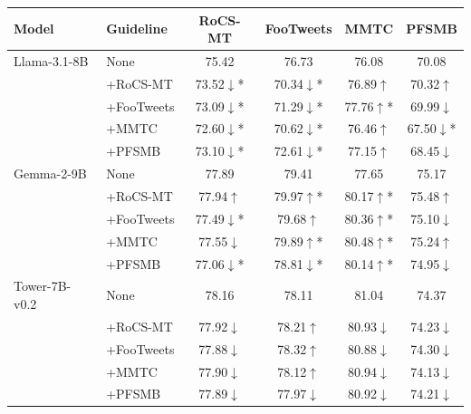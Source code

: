 \begin{tabular}{llcccc}
\toprule
Model & Guideline & RoCS-MT & FooTweets & MMTC & PFSMB \\
\midrule
Llama-3.1-8B & None & 75.42 & 76.73 & 76.08 & 70.08 \\
 & +RoCS-MT & 73.52\colorbox{myred}{$\downarrow$}* & 70.34\colorbox{myred}{$\downarrow$}* & 76.89\colorbox{mygreen}{$\uparrow$} & 70.32\colorbox{mygreen}{$\uparrow$} \\
 & +FooTweets & 73.09\colorbox{myred}{$\downarrow$}* & 71.29\colorbox{myred}{$\downarrow$}* & 77.76\colorbox{mygreen}{$\uparrow$}* & 69.99\colorbox{myred}{$\downarrow$} \\
 & +MMTC & 72.60\colorbox{myred}{$\downarrow$}* & 70.62\colorbox{myred}{$\downarrow$}* & 76.46\colorbox{mygreen}{$\uparrow$} & 67.50\colorbox{myred}{$\downarrow$}* \\
 & +PFSMB & 73.10\colorbox{myred}{$\downarrow$}* & 72.61\colorbox{myred}{$\downarrow$}* & 77.15\colorbox{mygreen}{$\uparrow$} & 68.45\colorbox{myred}{$\downarrow$} \\
Gemma-2-9B & None & 77.89 & 79.41 & 77.65 & 75.17 \\
 & +RoCS-MT & 77.94\colorbox{mygreen}{$\uparrow$} & 79.97\colorbox{mygreen}{$\uparrow$}* & 80.17\colorbox{mygreen}{$\uparrow$}* & 75.48\colorbox{mygreen}{$\uparrow$} \\
 & +FooTweets & 77.49\colorbox{myred}{$\downarrow$}* & 79.68\colorbox{mygreen}{$\uparrow$} & 80.36\colorbox{mygreen}{$\uparrow$}* & 75.10\colorbox{myred}{$\downarrow$} \\
 & +MMTC & 77.55\colorbox{myred}{$\downarrow$} & 79.89\colorbox{mygreen}{$\uparrow$}* & 80.48\colorbox{mygreen}{$\uparrow$}* & 75.24\colorbox{mygreen}{$\uparrow$} \\
 & +PFSMB & 77.06\colorbox{myred}{$\downarrow$}* & 78.81\colorbox{myred}{$\downarrow$}* & 80.14\colorbox{mygreen}{$\uparrow$}* & 74.95\colorbox{myred}{$\downarrow$} \\
Tower-7B-v0.2 & None & 78.16 & 78.11 & 81.04 & 74.37 \\
 & +RoCS-MT & 77.92\colorbox{myred}{$\downarrow$} & 78.21\colorbox{mygreen}{$\uparrow$} & 80.93\colorbox{myred}{$\downarrow$} & 74.23\colorbox{myred}{$\downarrow$} \\
 & +FooTweets & 77.88\colorbox{myred}{$\downarrow$} & 78.32\colorbox{mygreen}{$\uparrow$} & 80.88\colorbox{myred}{$\downarrow$} & 74.30\colorbox{myred}{$\downarrow$} \\
 & +MMTC & 77.90\colorbox{myred}{$\downarrow$} & 78.12\colorbox{mygreen}{$\uparrow$} & 80.94\colorbox{myred}{$\downarrow$} & 74.13\colorbox{myred}{$\downarrow$} \\
 & +PFSMB & 77.89\colorbox{myred}{$\downarrow$} & 77.97\colorbox{myred}{$\downarrow$} & 80.92\colorbox{myred}{$\downarrow$} & 74.21\colorbox{myred}{$\downarrow$} \\
\bottomrule
\end{tabular}
